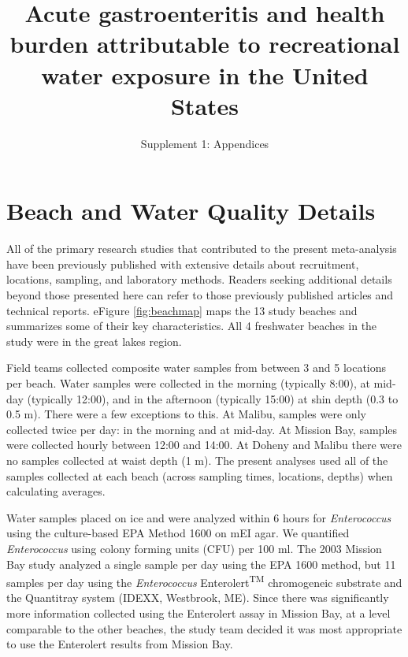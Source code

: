 \documentclass[12pt]{article}\usepackage[]{graphicx}\usepackage[]{color}
\title{Acute gastroenteritis and health burden attributable to recreational water exposure in the United States}
\author{Supplement 1: Appendices}
\date{}
\begin{document}
\maketitle
\tableofcontents






\clearpage
\section{Beach and Water Quality Details}

All of the primary research studies that contributed to the present meta-analysis have been previously published with extensive details about recruitment, locations, sampling, and laboratory methods. Readers seeking additional details beyond those presented here can refer to those previously published articles and technical reports.\supercite{Colford2005-nb, Colford2007-mc,Wade2006-pp,Wade2008-xj,Wade2010-bb,Wade2010-ps,Colford2012-um,Arnold2013-xd,Yau2014-pl} eFigure \ref{fig:beachmap} maps the 13 study beaches and summarizes some of their key characteristics. All 4 freshwater beaches in the study were in the great lakes region. 

Field teams collected composite water samples from between 3 and 5 locations per beach. Water samples were collected in the morning (typically 8:00), at mid-day (typically 12:00), and in the afternoon (typically 15:00) at shin depth (0.3 to 0.5 m).  There were a few exceptions to this. At Malibu, samples were only collected twice per day: in the morning and at mid-day. At Mission Bay, samples were collected hourly between 12:00 and 14:00. At Doheny and Malibu there were no samples collected at waist depth (1 m).  The present analyses used all of the samples collected at each beach (across sampling times, locations, depths) when calculating averages.

Water samples placed on ice and were analyzed within 6 hours for \textit{Enterococcus} using the culture-based EPA Method 1600\supercite{Epa2009-dm} on mEI agar.  We quantified \textit{Enterococcus} using colony forming units (CFU) per 100 ml.  The 2003 Mission Bay study analyzed a single sample per day using the EPA 1600 method, but 11 samples per day using the \textit{Enterococcus} Enterolert\textsuperscript{TM} chromogeneic substrate and the Quantitray system (IDEXX, Westbrook, ME). Since there was significantly more information collected using the Enterolert assay in Mission Bay, at a level comparable to the other beaches, the study team decided it was most appropriate to use the Enterolert results from Mission Bay.
\end{document}
